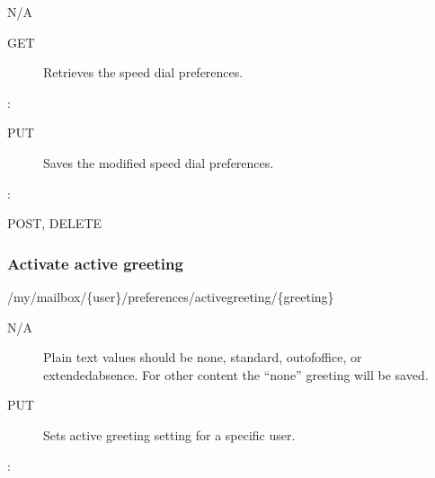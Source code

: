\documentclass[letterpaper,10pt,english]{sphinxmanual}
\begin{document}
 N/A
\begin{description}
\item[{ GET}] \leavevmode
Retrieves the speed dial preferences.

\end{description}

:

\begin{sphinxVerbatim}[commandchars=\\\{\}]
\end{sphinxVerbatim}
\begin{description}
\item[{ PUT}] \leavevmode
Saves the modified speed dial preferences.

\end{description}

:

\begin{sphinxVerbatim}[commandchars=\\\{\}]
\end{sphinxVerbatim}

 POST, DELETE


\subsubsection{Activate active greeting}
\label{\detokenize{restapi:activate-active-greeting}}
 /my/mailbox/\{user\}/preferences/activegreeting/\{greeting\}

 N/A
\begin{description}
\item[{}] \leavevmode
Plain text values should be none, standard, outofoffice, or extendedabsence. For other content the “none” greeting will be saved.

\item[{ PUT}] \leavevmode
Sets active greeting setting for a specific user.

\end{description}

:

\begin{sphinxVerbatim}[commandchars=\\\{\}]
\end{sphinxVerbatim}
\end{document}
